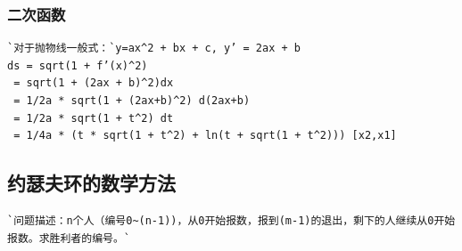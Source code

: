 \documentclass[a4paper]{article}
\begin{document}
\begin{CJK*}{UTF8}{gbsn}
\begin{multicols}{3}
\begin{flushleft}
\subsubsection{二次函数}
\begin{lstlisting}
`对于抛物线一般式：`y=ax^2 + bx + c, y’ = 2ax + b
ds = sqrt(1 + f’(x)^2)
 = sqrt(1 + (2ax + b)^2)dx 
 = 1/2a * sqrt(1 + (2ax+b)^2) d(2ax+b)
 = 1/2a * sqrt(1 + t^2) dt
 = 1/4a * (t * sqrt(1 + t^2) + ln(t + sqrt(1 + t^2))) [x2,x1]
\end{lstlisting}

\subsection{约瑟夫环的数学方法}
\begin{lstlisting}
`问题描述：n个人（编号0~(n-1))，从0开始报数，报到(m-1)的退出，剩下的人继续从0开始报数。求胜利者的编号。`


\end{lstlisting}
\end{flushleft}
\end{multicols}
\end{CJK*}
\end{document}
